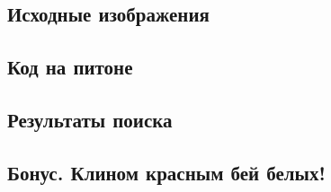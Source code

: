 \subsection{Исходные изображения}

\subsection{Код на питоне}
\subsection{Результаты поиска}
\subsection{Бонус. Клином красным бей белых!}

